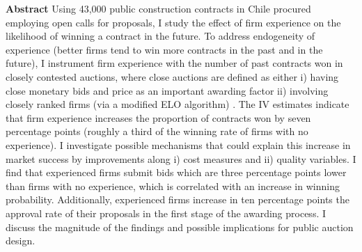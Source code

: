 

\centering
\textbf{Abstract}
\justify
\footnotesize
Using 43,000 public construction contracts in Chile procured employing open calls for proposals, I study the effect of firm experience on the likelihood of winning a contract in the future. To address endogeneity of experience (better firms tend to win more contracts in the past and in the future), I instrument firm experience with the number of past contracts won in closely contested auctions, where close auctions are defined as either i) having close monetary bids and price as an important awarding factor ii) involving closely ranked firms (via a modified ELO algorithm) . The IV estimates indicate that firm experience increases the proportion of contracts won by seven percentage points (roughly a third of the winning rate of firms with no experience). I investigate possible mechanisms that could explain this increase in market success by improvements along i) cost measures and ii) quality variables. I find that experienced firms submit bids which are three percentage points lower than firms with no experience, which is correlated with an increase in winning probability. Additionally, experienced firms increase in ten percentage points the approval rate of their proposals in the first stage of the awarding process. I discuss the magnitude of the findings and possible implications for public auction design.
